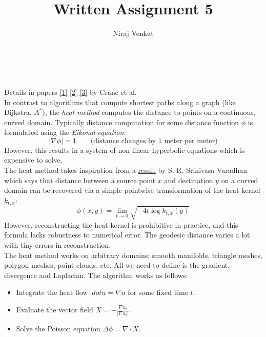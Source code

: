 \documentclass{article}
\newcommand\ifrac[2]{{\displaystyle\frac{#1}{#2}}}
\def\grad{\nabla}
\def\lap{\Delta}
\begin{document}
\title{Written Assignment 5}

\author{Niraj Venkat}

\date{}

\maketitle

\vspace{.8cm}
\\\\


Details in papers \href{http://www.cs.cmu.edu/~kmcrane/Projects/GeodesicsInHeat/paper.pdf}{[1]} 
\href{https://www.cs.cmu.edu/~kmcrane/Projects/HeatMethod/paperTOG.pdf}{[2]}
\href{https://arxiv.org/abs/2007.10430}{[3]}  by Crane et al.\\

In contrast to algorithms that compute shortest paths along a graph (like Dijkstra, $A^*$), the \emph{heat method}
computes the distance to points on a continuous, curved domain. Typically distance computation for some distance function
$\phi$ is formulated using the \emph{Eikonal equation}:
$$
    |\grad \phi| = 1 \quad\quad \text{(distance changes by 1 meter per meter)}
$$
However, this results in a system of non-linear hyperbolic equations which is expensive to solve.\\

The heat method takes inspiration from a \href{http://sci-hub.se/https://doi.org/10.1002/cpa.3160200210}{result}
by S. R. Srinivasa Varadhan which says that distance between a source point $x$ and destination $y$ on a curved domain
can be recovered via a simple pointwise transformation of the heat kernel $k_{t, x}$:
$$
    \phi(x, y) = \lim_{t \rightarrow 0} \sqrt{-4t \log k_{t, x}(y)}
$$
However, reconstructing the heat kernel is prohibitive in practice, and this formula lacks robustness to numerical error.
The geodesic distance varies a lot with tiny errors in reconstruction.\\

The heat method works on arbitrary domains: smooth manifolds, triangle meshes, polygon meshes, point clouds, etc. All we need
to define is the gradient, divergence and Laplacian. The algorithm works as follows:
\begin{itemize}
    \item Integrate the heat flow $\ dot{u} = \grad u$ for some fixed time $t$.
    \item Evaluate the vector field $X = -\ifrac{\grad u_t}{|\grad u_t|}$.
    \item Solve the Poisson equation $\lap \phi = \grad \cdot X$.
\end{itemize}
\end{document}
